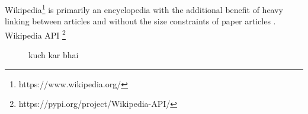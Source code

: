 Wikipedia\footnote{https://www.wikipedia.org/} is primarily an encyclopedia with the additional benefit of heavy linking between articles and without the size constraints of paper articles \parencite{TorstenZesch}. Wikipedia API \footnote{https://pypi.org/project/Wikipedia-API/}




\begin{figure}[h!]
    \centering
    
    \caption{kuch kar bhai}
    \label{fig:propn}
\end{figure}


